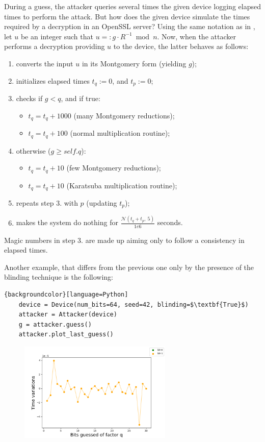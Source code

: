 During a guess, the attacker queries several times the given device logging elapsed times to perform the attack. But how does the given device simulate the times required by a decryption in an OpenSSL server?
Using the same notation as in , let $u$ be an integer such that $u =: g \cdot R^{-1} \bmod n$. Now, when the attacker performs a decryption providing $u$ to the device, the latter behaves as follows:
\begin{enumerate}
  \item converts the input $u$ in its Montgomery form (yielding $g$);
  \item initializes elapsed times $t_q := 0$, and $t_p := 0$;
  \item checks if $g < q$, and if true:
    \begin{itemize}
      \item $t_q = t_q + 1000$ (many Montgomery reductions);
      \item $t_q = t_q + 100$ (normal multiplication routine);
    \end{itemize}
  \item[] otherwise ($g \ge self.q$):
    \begin{itemize}
      \item $t_q = t_q + 10$ (few Montgomery reductions);
      \item $t_q = t_q + 10$ (Karatsuba multiplication routine);
    \end{itemize}
  \item repeats step 3. with $p$ (updating $t_p$);
  \item makes the system do nothing for $\frac{\mathcal{N}(t_q + t_p,\ 5)}{1e6}$ seconds.
\end{enumerate}

Magic numbers in step 3. are made up aiming only to follow a consistency in elapsed times.

Another example, that differs from the previous one only by the presence of the blinding technique is the following:

\begin{lstlisting}{backgroundcolor}[language=Python]
    device = Device(num_bits=64, seed=42, blinding=$\textbf{True}$)
    attacker = Attacker(device)
    g = attacker.guess()
    attacker.plot_last_guess()
\end{lstlisting}

\begin{figure}[h]
  \includegraphics[width=0.65\textwidth]{figures/brumley_and_boneh_output_example_with_blinding}
\end{figure}

